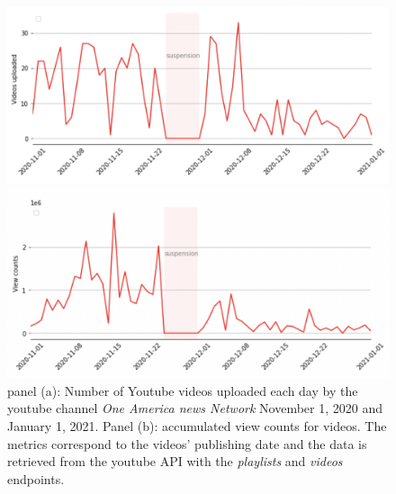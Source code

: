 \documentclass[11pt,a4paper]{article}
\begin{document}
\begin{figure}
\centering
\begin{multicols}{1}
    \includegraphics[scale=0.3]{./img/oann/fig1_oann.png}\par 
    \end{multicols}
\begin{multicols}{1}
    \includegraphics[scale=0.3]{./img/oann/fig2_oann.png}\par
\end{multicols}
\caption{panel (a): Number of Youtube videos uploaded each day by the youtube channel {\it One America news Network} November 1, 2020 and January 1, 2021. Panel (b): accumulated view counts for videos. The metrics correspond to the videos’  publishing date and the data is retrieved from the youtube API with the {\it playlists} and  {\it videos} endpoints. }
\label{fig1_oann}
\end{figure}
\end{document}
